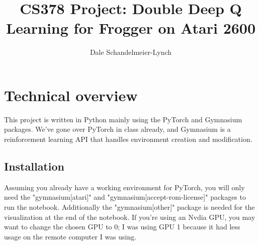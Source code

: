 \documentclass{homework}
\title{CS378 Project: Double Deep Q Learning for Frogger on Atari 2600}
\author{Dale Schandelmeier-Lynch}
\begin{document}
\maketitle
\tableofcontents
\nocite{*}
\section{Technical overview}
This project is written in Python mainly using the PyTorch and Gymnasium packages.
We've gone over PyTorch in class already, and Gymnasium is a reinforcement learning API that handles environment creation and modification.
\subsection{Installation}
Assuming you already have a working environment for PyTorch, you will only need the "gymnasium[atari]" and "gymnasium[accept-rom-license]" packages to run the notebook. Additionally the "gymnasium[other]" package is needed for the visualization at the end of the notebook. If you're using an Nvdia GPU, you may want to change the chosen GPU to 0; I was using GPU 1 because it had less usage on the remote computer I was using.
\newpage
\end{document}
